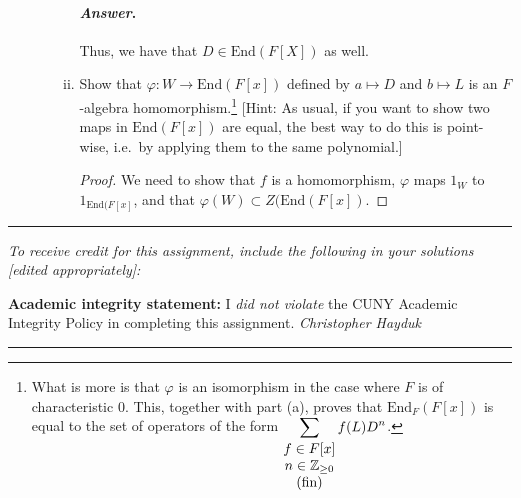 \documentclass[11pt, reqno]{amsart}
\theoremstyle{plain}
\theoremstyle{definition}
\theoremstyle{example}
\newenvironment{ans}{\medskip \paragraph*{\emph{Answer}.}}{\hfill \break  $~\!\!$ \dotfill \medskip }
\def\End{\mathrm{End}}
\def\f{\varphi}
\begin{document}
\begin{enumerate}[1.]
\begin{enumerate}[(a)]
\begin{enumerate}[(i)]
\begin{ans}
Thus, we have that $D \in \End(F[X])$ as well.
\end{ans}
\item Show that $\f: W \to \End(F[x])$ defined by $a \mapsto D$ and $b \mapsto L$ is an $F$-algebra homomorphism.\footnote{What is more is that $\f$ is an isomorphism in the case where $F$ is of characteristic $0$. This, together with part (a), proves that $\End_F(F[x])$ is equal to the set of operators of the form $\displaystyle \sum_{\begin{matrix}f \in F[x] \\ n \in \mathbb{Z}_{\ge 0} \\ \text{(fin)}\end{matrix}} f(L)D^n$.} {[Hint: As usual, if you want to show two maps in $\End(F[x])$ are equal, the best way to do this is point-wise, i.e.\ by applying them to the same polynomial.]}

\begin{proof}
We need to show that $f$ is a homomorphism, $\f$ maps $1_W$ to $1_{\End(F[x]}$, and that $\f(W) \subset Z(\End(F[x])$.
\end{proof}

\end{enumerate}




\end{enumerate}
\end{enumerate}

\vfill


\hrule
\emph{\small To receive credit for this assignment, include the following in your solutions [edited appropriately]:}

\smallskip

\textbf{Academic integrity statement:} I \emph{did not violate} the CUNY Academic Integrity Policy in completing this assignment. \hfill \emph{Christopher Hayduk}

\medskip
\hrule

\vfill
\end{document}
